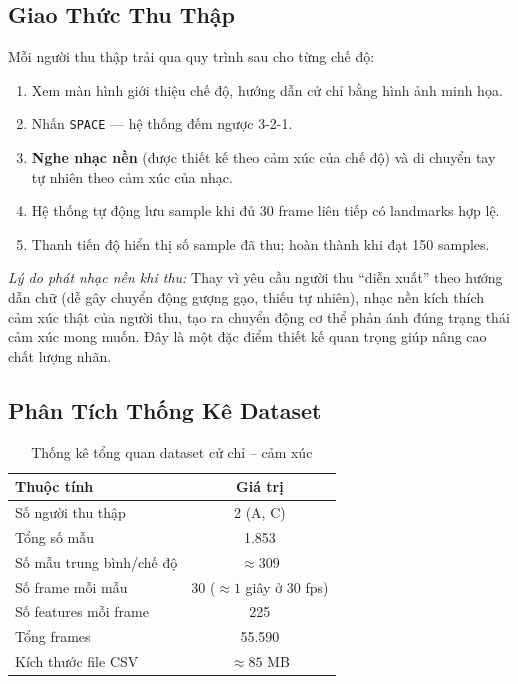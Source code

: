\subsection{Giao Thức Thu Thập}

Mỗi người thu thập trải qua quy trình sau cho từng chế độ:
\begin{enumerate}
  \item Xem màn hình giới thiệu chế độ, hướng dẫn cử chỉ bằng hình ảnh minh họa.
  \item Nhấn \texttt{SPACE} --- hệ thống đếm ngược 3-2-1.
  \item \textbf{Nghe nhạc nền} (được thiết kế theo cảm xúc của chế độ) và
        di chuyển tay tự nhiên theo cảm xúc của nhạc.
  \item Hệ thống tự động lưu sample khi đủ 30 frame liên tiếp có landmarks hợp lệ.
  \item Thanh tiến độ hiển thị số sample đã thu; hoàn thành khi đạt 150 samples.
\end{enumerate}

\textit{Lý do phát nhạc nền khi thu:}
Thay vì yêu cầu người thu ``diễn xuất'' theo hướng dẫn chữ (dễ gây chuyển động
gượng gạo, thiếu tự nhiên), nhạc nền kích thích cảm xúc thật của người thu,
tạo ra chuyển động cơ thể phản ánh đúng trạng thái cảm xúc mong muốn.
Đây là một đặc điểm thiết kế quan trọng giúp nâng cao chất lượng nhãn.

\subsection{Phân Tích Thống Kê Dataset}

\begin{table}[H]
  \centering
  \caption{Thống kê tổng quan dataset cử chỉ -- cảm xúc}
  \label{tab:dataset_stats}
  \begin{tabular}{lc}
    \toprule
    \textbf{Thuộc tính} & \textbf{Giá trị} \\
    \midrule
    Số người thu thập     & 2 (A, C) \\
    Tổng số mẫu           & 1.853 \\
    Số mẫu trung bình/chế độ & $\approx 309$ \\
    Số frame mỗi mẫu      & 30 ($\approx 1$ giây ở 30 fps) \\
    Số features mỗi frame & 225 \\
    Tổng frames           & 55.590 \\
    Kích thước file CSV   & $\approx 85$ MB \\
    \bottomrule
  \end{tabular}
\end{table}

